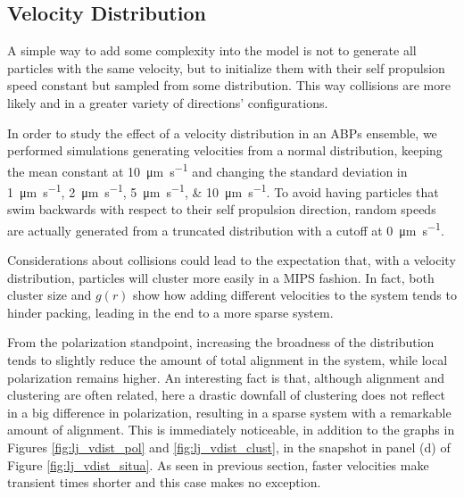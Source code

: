 \documentclass[../../master_thesis_np.tex]{subfiles}
\begin{document}
		\subsection{Velocity Distribution}
		A simple way to add some complexity into the model is not to generate all particles with the same velocity, but to initialize them with their self propulsion speed constant but sampled from some distribution. 
		This way collisions are more likely and in a greater variety of directions' configurations.
		
		In order to study the effect of a velocity distribution in an ABPs ensemble, we performed simulations generating velocities from a normal distribution, keeping the mean constant at \SI{10}{\um \per \second} and changing the standard deviation in \qtylist{1; 2; 5; 10}{\um \per \second}.
		To avoid having particles that swim backwards with respect to their self propulsion direction, random speeds are actually generated from a truncated distribution with a cutoff at \SI{0}{\um \per \second}.
		
		Considerations about collisions could lead to the expectation that, with a velocity distribution, particles will cluster more easily in a MIPS fashion.
		In fact, both cluster size and $g(r)$ show how adding different velocities to the system tends to hinder packing, leading in the end to a more sparse system.
		
		From the polarization standpoint, increasing the broadness of the distribution tends to slightly reduce the amount of total alignment in the system, while local polarization remains higher. 
		An interesting fact is that, although alignment and clustering are often related, here a drastic downfall of clustering does not reflect in a big difference in polarization, resulting in a sparse system with a remarkable amount of alignment.
		This is immediately noticeable, in addition to the graphs in Figures \ref{fig:lj_vdist_pol} and \ref{fig:lj_vdist_clust}, in the snapshot in panel (d) of Figure \ref{fig:lj_vdist_situa}.
		As seen in previous section, faster velocities make transient times shorter and this case makes no exception.
		
\end{document}

